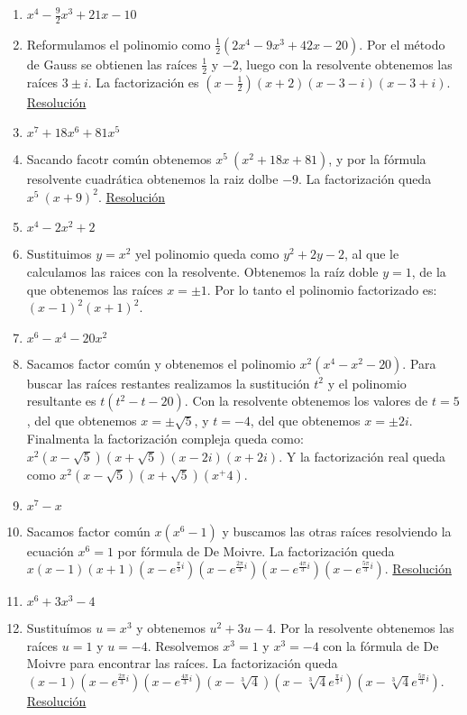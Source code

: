 \documentclass[a4paper]{article}
\newcommand{\answer}{\item[**]}
\newcommand{\df}[2]{\displaystyle\frac{#1}{#2}}
\begin{document}
\begin{enumerate}
\begin{multicols}{2}
\begin{enumerate} [label=(\alph*)]
		\item $x^4-\df{9}{2}x^3+21x-10$
		\answer Reformulamos el polinomio como $\df{1}{2}(2x^4-9x^3+42x-20)$. Por el método de Gauss se obtienen las raíces $\df{1}{2}$ y $-2$, luego con la resolvente obtenemos las raíces $3\pm i$. La factorización es $\left(x-\df{1}{2}\right)(x+2)(x-3-i)(x-3+i)$. \href{https://youtu.be/1V06bnuaadA}{Resolución}

		\item $x^7+18x^6+81x^5$
		\answer Sacando facotr común obtenemos $x^5~(x^2+18x+81)$, y por la fórmula resolvente cuadrática obtenemos la raiz dolbe $-9$. La factorización queda $x^5~(x+9)^2$. \href{https://youtu.be/Z1KatpJM2eU}{Resolución}

		\item $x^4-2x^2+2$
		\answer Sustituimos $y=x^2$ yel polinomio queda como $y^2+2y-2$, al que le calculamos las raices con la resolvente. Obtenemos la raíz doble $y=1$, de la que obtenemos las raíces $x=\pm1$. Por lo tanto el polinomio factorizado es: $(x-1)^2(x+1)^2$. 

		\item $x^6-x^4-20x^2$
		\answer Sacamos factor común y obtenemos el polinomio $x^2(x^4-x^2-20)$. Para buscar las raíces restantes realizamos la sustitución $t^2$ y el polinomio resultante es $t(t^2-t-20)$. Con la resolvente obtenemos los valores de $t=5$, del que obtenemos $x=\pm \sqrt{5}$, y $t=-4$, del que obtenemos $x=\pm2i$. Finalmenta la factorización compleja queda como: $x^2(x-\sqrt{5})(x+\sqrt{5})(x-2i)(x+2i)$. Y la factorización real queda como $x^2(x-\sqrt{5})(x+\sqrt{5})(x^+4)$.
		
		\item $x^7-x$
		\answer Sacamos factor común $x(x^6-1)$ y buscamos las otras raíces resolviendo la ecuación $x^6=1$ por fórmula de De Moivre. La factorización queda $x (x-1) (x+1) (x-e^{\frac{\pi}{3}i}) (x-e^{\frac{2\pi}{3}i}) (x-e^{\frac{4\pi}{3}i}) (x-e^{\frac{5\pi}{3}i})$. \href{https://youtu.be/EQIEmdkGOZE}{Resolución}

		\item $x^6+3x^3-4$
		\answer Sustituímos $u=x^3$ y obtenemos $u^2+3u-4$. Por la resolvente obtenemos las raíces $u=1$ y $u=-4$. Resolvemos $x^3=1$ y $x^3=-4$ con la fórmula de De Moivre para encontrar las raíces. La factorización queda $(x-1)(x-e^{\frac{2\pi}{3}i})(x-e^{\frac{4\pi}{3}i})(x-\sqrt[3]{4})(x-\sqrt[3]{4}e^{\frac{\pi}{3}i})(x-\sqrt[3]{4}e^{\frac{5\pi}{3}i})$. \href{https://youtu.be/BCo0pxE288w}{Resolución}

	\end{enumerate}
	\end{multicols}



\end{enumerate}
\end{document}
